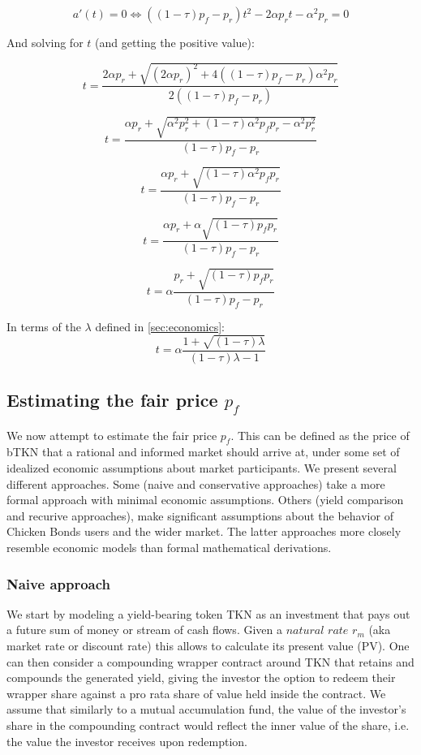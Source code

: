 \documentclass{article}
\begin{document}
\[
a'(t) = 0 \iff ((1-\tau)p_f-p_r)t^2  - 2\alpha p_r t - \alpha^2 p_r = 0
\]

And solving for $t$ (and getting the positive value):

\[
t = \frac{2\alpha p_r + \sqrt{(2\alpha p_r)^2 + 4((1-\tau)p_f-p_r) \alpha^2 p_r}}{2((1-\tau)p_f-p_r)}
\]

\[
t = \frac{\alpha p_r + \sqrt{\alpha^2 p_r^2 + (1-\tau) \alpha^2 p_f p_r- \alpha^2 p_r^2}}{(1-\tau)p_f-p_r}
\]

\[
t = \frac{\alpha p_r + \sqrt{(1-\tau) \alpha^2 p_f p_r}}{(1-\tau)p_f-p_r}
\]

\[
t = \frac{\alpha p_r + \alpha \sqrt{(1-\tau)p_f p_r}}{(1-\tau)p_f-p_r}
\]

\begin{equation}
  \label{eq:optimal_chicken_in_1_fee}
t = \alpha \frac{p_r + \sqrt{(1-\tau)p_f p_r}}{(1-\tau)p_f-p_r}
\end{equation}

In terms of the $\lambda$ defined in \ref{sec:economics}:
\begin{equation}
  \label{eq:optimal_chicken_in_2_fee}
t = \alpha \frac{1 + \sqrt{(1-\tau)\lambda}}{(1-\tau)\lambda - 1}
\end{equation}

\subsection{Estimating the fair price $p_f$}
We now attempt to estimate the fair price $p_f$. This can be defined as the price of bTKN that a rational and informed market should arrive at, under some set of idealized economic assumptions about market participants. We present several different approaches. Some (naive and conservative approaches) take a more formal approach with minimal economic assumptions. Others (yield comparison and recurive approaches), make significant assumptions about the behavior of Chicken Bonds users and the wider market. The latter approaches more closely resemble economic models than formal mathematical derivations.

\subsubsection{Naive approach}
\label{sec:naive_approach}
We start by modeling a yield-bearing token TKN as an investment that pays out a future sum of money or stream of cash flows. Given a $\textit{natural rate}$ $r_m$ (aka market rate or discount rate) this allows to calculate its present value (PV). One can then consider a compounding wrapper contract around TKN that retains and compounds the generated yield, giving the investor the option to redeem their wrapper share against a pro rata share of value held inside the contract. We assume that similarly to a mutual accumulation fund, the value of the investor's share in the compounding contract would reflect the inner value of the share, i.e. the value the investor receives upon redemption. 
\end{document}
